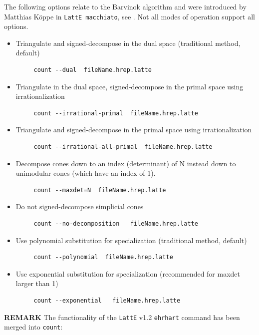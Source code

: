 \documentclass{article}
\newcommand{\latte}{{\tt LattE}\xspace}
\newcommand{\latteMac}{{\tt LattE macchiato}\xspace}
\begin{document}
The following options relate to the Barvinok algorithm and were introduced by
Matthias K\"oppe in \latteMac, see \cite{koeppe:irrational-barvinok}.  Not all modes of operation
support all options.
\begin{itemize}
\item Triangulate and signed-decompose in the dual space (traditional method, default)
        \begin{verbatim}
     count --dual  fileName.hrep.latte
        \end{verbatim} 
\item Triangulate in the dual space, signed-decompose in the primal space using irrationalization
        \begin{verbatim}
     count --irrational-primal  fileName.hrep.latte
        \end{verbatim} 
\item Triangulate and signed-decompose in the primal space  using irrationalization
        \begin{verbatim}
     count --irrational-all-primal  fileName.hrep.latte
        \end{verbatim} 
\item  Decompose cones down to an index (determinant) of N instead down to
  unimodular cones (which have an index of 1).  
        \begin{verbatim}
     count --maxdet=N  fileName.hrep.latte
        \end{verbatim} 
\item Do not signed-decompose simplicial cones
        \begin{verbatim}
     count --no-decomposition   fileName.hrep.latte
        \end{verbatim} 
\item Use polynomial substitution for specialization (traditional method, default)
        \begin{verbatim}
     count --polynomial  fileName.hrep.latte
        \end{verbatim}  
\item Use exponential substitution for specialization (recommended for maxdet larger than 1)
        \begin{verbatim}
     count --exponential   fileName.hrep.latte
        \end{verbatim}  
                        
\end{itemize}


\textbf{REMARK}  The functionality of the \latte v1.2 {\tt ehrhart} command has been merged into {\tt count}:
\end{document}
